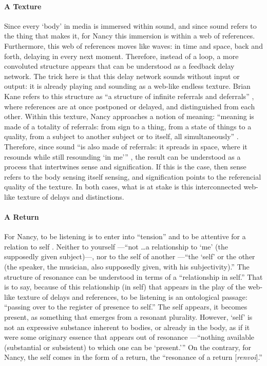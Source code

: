 \paragraph{A Texture}
Since every `body' in media is immersed within sound, and since sound refers to the thing that makes it, for Nancy this immersion is within a web of references. Furthermore, this web of references moves like waves: in time and space, back and forth, delaying in every next moment. Therefore, instead of a loop, a more convoluted structure appears that can be understood as a feedback delay network. The trick here is that this delay network sounds without input or output: it is already playing and sounding as a web-like endless texture. Brian Kane refers to this structure as ``a structure of infinite referrals and deferrals'' \parencite[143]{Gra15:The}, where references are at once postponed or delayed, and distinguished from each other. Within this texture, Nancy approaches a notion of meaning: ``meaning is made of a totality of referrals: from sign to a thing, from a state of things to a quality, from a subject to another subject or to itself, all simultaneously'' \parencite[4-9]{Nan07:Lis}. Therefore, since sound  ``is also made of referrals: it spreads in space, where it resounds while still resounding `in me''' \parencite[4-9]{Nan07:Lis}, the result can be understood as a process that intertwines sense and signification. If this is the case, then sense refers to the body sensing itself sensing, and signification points to the referencial quality of the texture. In both cases, what is at stake is this interconnected web-like texture of delays and distinctions. 

\paragraph{A Return}
For Nancy, to be listening is to enter into ``tension'' and to be attentive for a relation to self \parencite[12][All subsecuent quotes from this passage.]{Nan07:Lis}. Neither to yourself ---``not \dots a relationship to `me' (the supposedly given subject)---, nor to the self of another ---``the `self' or the other (the speaker, the musician, also supposedly given, with his subjectivity).'' The structure of resonance can be understood in terms of a ``relationship in self.'' That is to say, because of this relationship (in self) that appears in the play of the web-like texture of delays and references, to be listening is an ontological passage: ``passing over to the register of presence to self.'' The self appears, it becomes present, as something that emerges from a resonant plurality. However, `self' is not an expressive substance inherent to bodies, or already in the body, as if it were some originary essence that appears out of resonance ---``nothing available (substantial or subsistent) to which one can be `present.''' On the contrary, for Nancy, the self comes in the form of a return, the ``resonance of a return [\textit{renvoi}].'' 

